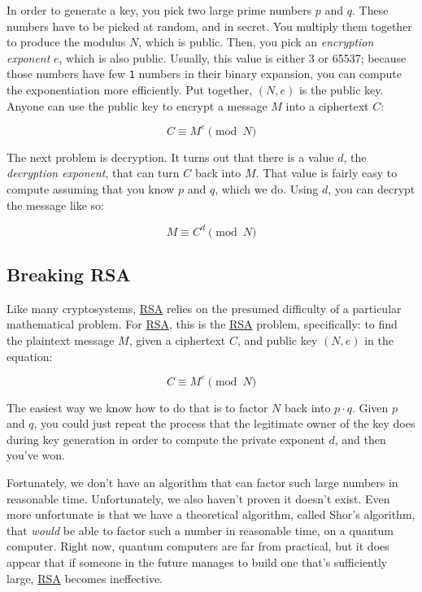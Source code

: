 \documentclass[11pt,ebook,table,dvipsnames]{memoir}
\begin{document}
In order to generate a key, you pick two large prime numbers $p$ and
$q$. These numbers have to be picked at random, and in secret. You
multiply them together to produce the modulus $N$, which is public.
Then, you pick an \emph{encryption exponent} $e$, which is also public.
Usually, this value is either 3 or 65537; because those numbers have
few \verb~1~ numbers in their binary expansion, you can compute the
exponentiation more efficiently. Put together, $(N, e)$ is the public
key. Anyone can use the public key to encrypt a message $M$ into a
ciphertext $C$:

\[
C \equiv M^e \pmod{N}
\]

The next problem is decryption. It turns out that there is a value
$d$, the \emph{decryption exponent}, that can turn $C$ back into $M$. That
value is fairly easy to compute assuming that you know $p$ and $q$,
which we do. Using $d$, you can decrypt the message like so:

\[
M \equiv C^d \pmod{N}
\]
\subsection{Breaking RSA}
\label{sec-2-5-3-2}

Like many cryptosystems, \hyperref[RSA]{RSA} relies on the presumed difficulty of a
particular mathematical problem. For \hyperref[RSA]{RSA}, this is the \hyperref[RSA]{RSA} problem,
specifically: to find the plaintext message $M$, given a ciphertext
$C$, and public key $(N, e)$ in the equation:

\begin{equation}
C \equiv M^e \pmod{N}
\end{equation}

The easiest way we know how to do that is to factor $N$ back into $p
\cdot q$. Given $p$ and $q$, you could just repeat the process that
the legitimate owner of the key does during key generation in order to
compute the private exponent $d$, and then you've won.

Fortunately, we don't have an algorithm that can factor such large
numbers in reasonable time. Unfortunately, we also haven't proven it
doesn't exist. Even more unfortunate is that we have a theoretical
algorithm, called Shor's algorithm, that \emph{would} be able to factor
such a number in reasonable time, on a quantum computer. Right now,
quantum computers are far from practical, but it does appear that if
someone in the future manages to build one that's sufficiently large,
\hyperref[RSA]{RSA} becomes ineffective.
\end{document}
